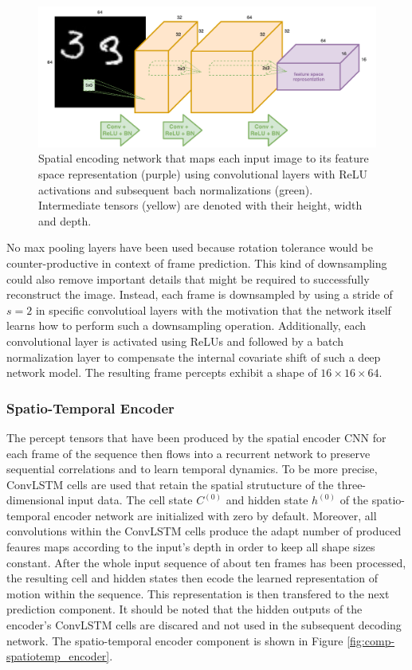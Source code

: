 \begin{figure}[htb]
	\centering
	\includegraphics[width=0.9\linewidth]{figures/comp_spatial_encoder.pdf} 
	\caption[Spatial Encoder Component]{Spatial encoding network that maps each input image to its feature space representation (purple) using convolutional layers with ReLU activations and subsequent bach normalizations (green). Intermediate tensors (yellow) are denoted with their height, width and depth.} \label{fig:comp-spatial_encoder}
\end{figure}

No max pooling layers have been used because rotation tolerance would be counter-productive in context of frame prediction. This kind of downsampling could also remove important details that might be required to successfully reconstruct the image. Instead, each frame is downsampled by using a stride of $ s=2 $ in specific convolutioal layers with the motivation that the network itself learns how to perform such a downsampling operation. Additionally, each convolutional layer is activated using ReLUs and followed by a batch normalization layer to compensate the internal covariate shift of such a deep network model. The resulting frame percepts exhibit a shape of $16\times16\times64$.

\subsubsection{Spatio-Temporal Encoder}

The percept tensors that have been produced by the spatial encoder CNN for each frame of the sequence then flows into a recurrent network to preserve sequential correlations and to learn temporal dynamics. To be more precise, ConvLSTM cells are used that retain the spatial strutucture of the three-dimensional input data. The cell state $C^{(0)}$ and hidden state $h^{(0)}$ of the spatio-temporal encoder network are initialized with zero by default. Moreover, all convolutions within the ConvLSTM cells produce the adapt number of produced feaures maps according to the input's depth in order to keep all shape sizes constant. After the whole input sequence of about ten frames has been processed, the resulting cell and hidden states then ecode the learned representation of motion within the sequence. This representation is then transfered to the next prediction component. It should be noted that the hidden outputs of the encoder's ConvLSTM cells are discared and not used in the subsequent decoding network. The spatio-temporal encoder component is shown in Figure \ref{fig:comp-spatiotemp_encoder}.

